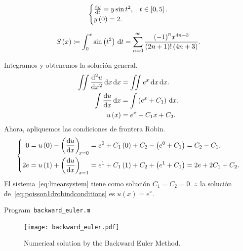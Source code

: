 \begin{equation*}
	\begin{cases}
		\diff{y}{t}=
		y\sin t^{2},       & t\in\left[0,5\right]. \\
		y\left(0\right)=2. &
	\end{cases}
\end{equation*}

\begin{equation*}
	S\left(x\right)\coloneqq
	\int_{0}^{x}\sin\left(t^{2}\right)\dl t=
	\sum_{n=0}^{\infty}
	\frac{{\left(-1\right)}^{n}x^{4n+3}}{\left(2n+1\right)!\left(4n+3\right)}.
\end{equation*}

Integramos y obtenemos la solución general.
\begin{align*}
	\iint
	\diff[2]{u}{x}
	\dl x
	\dl x           & =
	\iint
	e^{x}
	\dl x
	\dl x.              \\
	\int
	\diff{u}{x}
	\dl x           & =
	\int
	\left(e^{x}+C_{1}\right)
	\dl x.              \\
	u\left(x\right) & =
	e^{x}+C_{1}x+C_{2}.
\end{align*}
Ahora, apliquemos las condiciones de frontera Robin.
\begin{equation}\label{eq:linearsystem}
	\left\{
	\begin{aligned}
		0
		 & =
		u\left(0\right)-
		\diff{u}{x}[x=0]=
		e^{0}+C_{1}\left(0\right)+C_{2}-
		\left(e^{0}+C_{1}\right)=
		C_{2}-C_{1}. \\
		2e
		 & =
		u\left(1\right)+
		\diff{u}{x}[x=1]=
		e^{1}+C_{1}\left(1\right)+C_{2}+
		\left(e^{1}+C_{1}\right)=
		2e+2C_{1}+C_{2}.
	\end{aligned}
	\right.
\end{equation}
El sistema~\eqref{eq:linearsystem} tiene como solución
$C_{1}=C_{2}=0$.
$\therefore$ la solución
de~\eqref{eq:poisson1drobindconditions} es
$u\left(x\right)=e^{x}$.

\begin{listing}[ht!]
	\tiny
	\centering
	\caption{Program~\texttt{backward\_euler.m}}
	\label{code:backward_euler.m}
\end{listing}

\begin{figure}[ht!]
	\centering
	\texttt{[image: backward\_euler.pdf]}
	\caption{Numerical solution by the Backward Euler Method.}
\end{figure}

